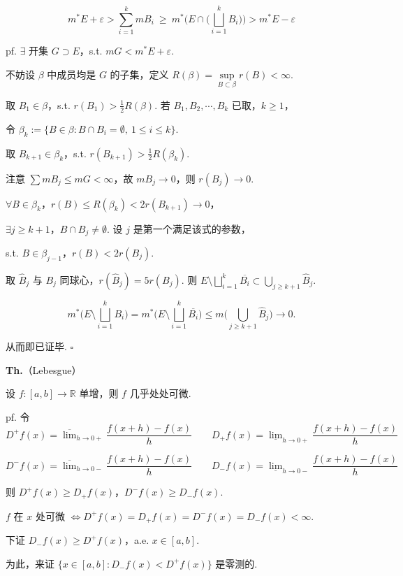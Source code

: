 \documentclass[11pt]{ctexart}
\theoremstyle{definition}
\begin{document}
\[
m^*E + \varepsilon > \sum_{i=1}^{k} mB_i \ \geq\ m^*\Big(E \cap \big(\bigsqcup_{i=1}^{k} B_i\big)\Big) > m^*E - \varepsilon
\]

pf. $\exists$ 开集 $G \supset E$，s.t. $mG < m^*E + \varepsilon$.

不妨设 $\beta$ 中成员均是 $G$ 的子集，定义 $R(\beta) = \sup\limits_{B \subset \beta} r(B) < \infty$.

取 $B_1 \in \beta$，s.t. $r(B_1) > \tfrac{1}{2} R(\beta)$. 若 $B_1, B_2, \cdots, B_k$ 已取，$k \geq 1$，

令 $\beta_k := \{B \in \beta : B \cap B_i = \emptyset,\ 1 \leq i \leq k\}$.

取 $B_{k+1} \in \beta_k$，s.t. $r(B_{k+1}) > \tfrac{1}{2} R(\beta_k)$.

注意 $\sum mB_j \leq mG < \infty$，故 $mB_j \to 0$，则 $r(B_j) \to 0$.

$\forall B \in \beta_k$，$r(B) \leq R(\beta_k) < 2r(B_{k+1}) \to 0$，

$\exists j \geq k+1$，$B \cap B_j \neq \emptyset$. 设 $j$ 是第一个满足该式的参数，

s.t. $B \in \beta_{j-1}$，$r(B) < 2r(B_j)$.

取 $\widehat{B}_j$ 与 $B_j$ 同球心，$r(\widehat{B}_j) = 5r(B_j)$. 则 $E \setminus \bigsqcup\limits_{i=1}^{k} \overline{B_i} \subset \bigcup\limits_{j \geq k+1} \widehat{B}_j$.

\[
m^*\Big(E \setminus \bigsqcup_{i=1}^{k} B_i\Big) = m^*\Big(E \setminus \bigsqcup_{i=1}^{k} \overline{B_i}\Big) \leq m\Big(\bigcup_{j \geq k+1} \widehat{B}_j\Big) \to 0.
\]

从而即已证毕. $\square$

\textbf{Th.}（Lebesgue）

设 $f: [a,b] \to \mathbb{R}$ 单增，则 $f$ 几乎处处可微.

pf. 令 $D^+ f(x) = \overline{\lim}_{h \to 0+} \dfrac{f(x+h) - f(x)}{h} \qquad D_+ f(x) = \underline{\lim}_{h \to 0+} \dfrac{f(x+h) - f(x)}{h}$

$D^- f(x) = \overline{\lim}_{h \to 0-} \dfrac{f(x+h) - f(x)}{h} \qquad D_- f(x) = \underline{\lim}_{h \to 0-} \dfrac{f(x+h) - f(x)}{h}$

则 $D^+ f(x) \geq D_+ f(x)$，$D^- f(x) \geq D_- f(x)$.

$f$ 在 $x$ 处可微 $\iff D^+ f(x) = D_+ f(x) = D^- f(x) = D_- f(x) < \infty$.

下证 $D_- f(x) \geq D^+ f(x)$，a.e. $x \in [a,b]$.

为此，来证 $\{x \in [a,b] : D_- f(x) < D^+ f(x)\}$ 是零测的.
\end{document}
